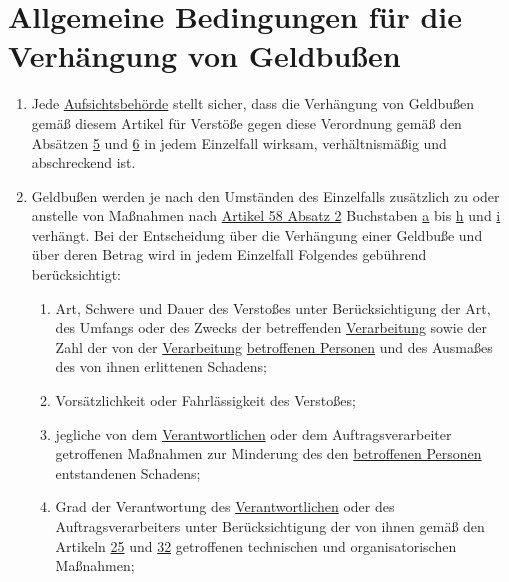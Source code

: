 \chapter{Allgemeine Bedingungen für die Verhängung von Geldbußen}
\label{ch:83}


\begin{enumerate}

  \item Jede \hyperref[itm:04-21]{Aufsichtsbehörde} stellt sicher, dass die Verhängung von Geldbußen gemäß diesem Artikel für Verstöße gegen
   diese Verordnung gemäß den Absätzen \hyperref[itm:83-5]{5} und \hyperref[itm:83-6]{6} in jedem Einzelfall wirksam,
   verhältnismäßig und abschreckend ist.
  \label{itm:83-1}

  \item Geldbußen werden je nach den Umständen des Einzelfalls zusätzlich zu oder anstelle von Maßnahmen nach \hyperref
   [itm:58-2]{Artikel 58 Absatz 2} Buchstaben \hyperref[itm:58-2a]{a} bis \hyperref[itm:58-2h]{h} und \hyperref
   [itm:58-2i]{i} verhängt. Bei der Entscheidung über die Verhängung einer Geldbuße und über deren Betrag wird in jedem
   Einzelfall Folgendes gebührend berücksichtigt:
  \label{itm:83-2}

  \begin{enumerate}
  
    \item Art, Schwere und Dauer des Verstoßes unter Berücksichtigung der Art, des Umfangs oder des Zwecks der
     betreffenden \hyperref[itm:04-2]{Verarbeitung} sowie der Zahl der von der \hyperref[itm:04-2]{Verarbeitung} \hyperref[itm:04-1]{betroffenen Personen} und des Ausmaßes des von
     ihnen erlittenen Schadens;
    \label{itm:83-2a}

    \item Vorsätzlichkeit oder Fahrlässigkeit des Verstoßes;
    \label{itm:83-2b}

    \item jegliche von dem \hyperref[itm:04-7]{Verantwortlichen} oder dem Auftragsverarbeiter getroffenen Maßnahmen zur Minderung des den
     \hyperref[itm:04-1]{betroffenen Personen} entstandenen Schadens;
    \label{itm:83-2c}

    \item Grad der Verantwortung des \hyperref[itm:04-7]{Verantwortlichen} oder des Auftragsverarbeiters unter Berücksichtigung der von ihnen
     gemäß den Artikeln \hyperref[ch:25]{25} und \hyperref[ch:32]{32} getroffenen technischen und organisatorischen
     Maßnahmen;
    \label{itm:83-2d}


\end{enumerate}
\end{enumerate}
